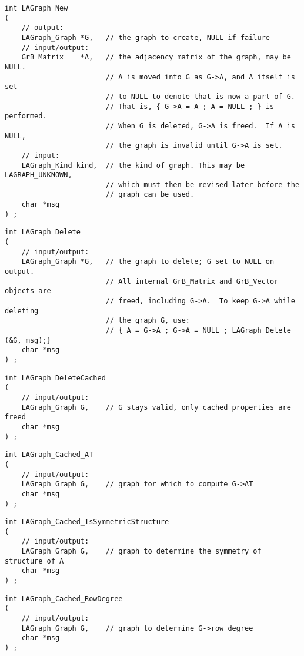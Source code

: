 \begin{verbatim}
int LAGraph_New
(
    // output:
    LAGraph_Graph *G,   // the graph to create, NULL if failure
    // input/output:
    GrB_Matrix    *A,   // the adjacency matrix of the graph, may be NULL.
                        // A is moved into G as G->A, and A itself is set
                        // to NULL to denote that is now a part of G.
                        // That is, { G->A = A ; A = NULL ; } is performed.
                        // When G is deleted, G->A is freed.  If A is NULL,
                        // the graph is invalid until G->A is set.
    // input:
    LAGraph_Kind kind,  // the kind of graph. This may be LAGRAPH_UNKNOWN,
                        // which must then be revised later before the
                        // graph can be used.
    char *msg
) ;
\end{verbatim}




\begin{verbatim}
int LAGraph_Delete
(
    // input/output:
    LAGraph_Graph *G,   // the graph to delete; G set to NULL on output.
                        // All internal GrB_Matrix and GrB_Vector objects are
                        // freed, including G->A.  To keep G->A while deleting
                        // the graph G, use:
                        // { A = G->A ; G->A = NULL ; LAGraph_Delete (&G, msg);}
    char *msg
) ;
\end{verbatim}




\begin{verbatim}
int LAGraph_DeleteCached
(
    // input/output:
    LAGraph_Graph G,    // G stays valid, only cached properties are freed
    char *msg
) ;
\end{verbatim}




\begin{verbatim}
int LAGraph_Cached_AT
(
    // input/output:
    LAGraph_Graph G,    // graph for which to compute G->AT
    char *msg
) ;
\end{verbatim}




\begin{verbatim}
int LAGraph_Cached_IsSymmetricStructure
(
    // input/output:
    LAGraph_Graph G,    // graph to determine the symmetry of structure of A
    char *msg
) ;
\end{verbatim}




\begin{verbatim}
int LAGraph_Cached_RowDegree
(
    // input/output:
    LAGraph_Graph G,    // graph to determine G->row_degree
    char *msg
) ;
\end{verbatim}




